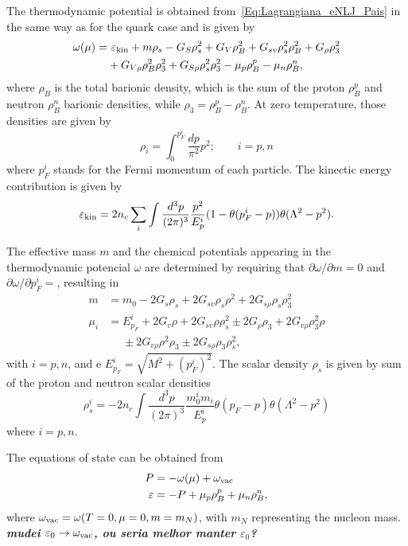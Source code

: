 \documentclass[prc, reprint, amsmath, floatfix, linenumbers,10pt]{revtex4-1}
\newcommand{\comment}[1]{{\bf\textit{#1}}}
\begin{document}
The thermodynamic potential is obtained from~\eqref{Eq:Lagrangiana_eNLJ_Pais} in the same way as for the quark case and is given by
\begin{equation}\label{Eq:potencial_termodinamico}
\begin{split}
	\omega(\mu) =&~ \varepsilon_{\rm{kin}} + m\rho_s - G_S\rho_s^2 + G_V\rho_B^2 + G_{sv}\rho_s^2\rho_B^2 + G_\rho\rho_3^2 \\
	&+ G_{V\rho}\rho_B^2\rho_3^2 + G_{S\rho}\rho_s^2\rho_3^2 - \mu_p\rho_B^p - \mu_n\rho_B^n,
\end{split}
\end{equation}
%
where $\rho_B$ is the total barionic density, which is the sum of the proton $\rho_B^p$ and neutron $\rho_B^n$ barionic densities, while $\rho_3 = \rho_B^p - \rho_B^n$. At zero temperature, those densities are given by
\begin{equation}
	\rho_i = \int_0^{p_F^i}\frac{dp}{\pi^2}p^2; \qquad i = p,n
\end{equation}
%
where $p_F^i$ stands for the Fermi momentum of each particle. The kinectic energy contribution is given by
\begin{equation}
	\varepsilon_{\rm{kin}} = 2 n_c \sum_i \int \frac{d^3p}{(2\pi)^3}\frac{p^2}{E_p^i}(1 - \theta(p_F^i - p))\theta(\Lambda^2 - p^2).
\end{equation}

The effective mass $m$ and the chemical potentials appearing in the thermodynamic potencial $\omega$ are determined by requiring that $\partial\omega/\partial m = 0$ and $\partial\omega/\partial p_F^i = $, resulting in
\begin{align}\label{Eq:Gap}
	m &= m_0 - 2G_s\rho_s + 2G_{sv}\rho_s\rho^2 + 2 G_{s\rho}\rho_s\rho_3^2 \\
	\mu_i &= E_{p_F}^i + 2G_v\rho + 2G_{sv}\rho\rho_s^2 \pm 2G_\rho\rho_3+2G_{v\rho}\rho_3^2\rho \nonumber \\
	&\phantom{=} \pm 2G_{v\rho}\rho^2\rho_3 \pm 2 G_{s\rho}\rho_3\rho_s^2,
\end{align}
%
with $i = p,n$, and e $E_{p_F}^i = \sqrt{M^2 + (p_F^i)^2}$. The scalar density $\rho_s$ is given by sum of the proton and neutron scalar densities
\begin{equation}
	\rho_s^i = - 2 n_c \int \frac{d^3p}{(2\pi)^3}\frac{m_0^i m_i}{E_p^i}\theta(p_F - p)\theta(\Lambda^2 - p^2)
\end{equation}
%
where $i = p, n$.

The equations of state can be obtained from
\begin{align}
	P &= -\omega(\mu) + \omega_{\rm{vac}} \\
	\varepsilon &= -P + \mu_p \rho_B^p + \mu_n \rho_B^n,
\end{align}
%
where $\omega_{\rm{vac}} = \omega(T = 0, \mu = 0, m = m_N)$, with $m_N$ representing the nucleon mass. \comment{mudei $\varepsilon_0 \to \omega_{\rm{vac}}$, ou seria melhor manter $\varepsilon_0$?} 
\end{document}
